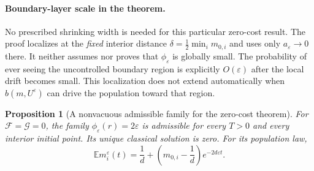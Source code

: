 \documentclass[11pt,a4paper]{article}
\newtheorem{proposition}[theorem]{Proposition}
\theoremstyle{definition}
\theoremstyle{remark}
\begin{document}
\paragraph{Boundary-layer scale in the theorem.}
No prescribed shrinking width is needed for this particular zero-cost result. The proof localizes at the \emph{fixed} interior distance $\delta=\frac12\min_i m_{0,i}$ and uses only $a_\varepsilon\to0$ there. It neither assumes nor proves that $\phi_\varepsilon$ is globally small. The probability of ever seeing the uncontrolled boundary region is explicitly $O(\varepsilon)$ after the local drift becomes small. This localization does not extend automatically when $b(m,U^\varepsilon)$ can drive the population toward that region.

\begin{proposition}[A nonvacuous admissible family for the zero-cost theorem]
For $\mathcal F=\mathcal G=0$, the family $\phi_\varepsilon(r)=2\varepsilon$ is admissible for every $T>0$ and every interior initial point. Its unique classical solution is zero. For its population law,
\[
 \mathbb E m_i^\varepsilon(t)=\frac1d+
       \left(m_{0,i}-\frac1d\right)e^{-2d\varepsilon t}.
\]
\end{proposition}
\end{document}
